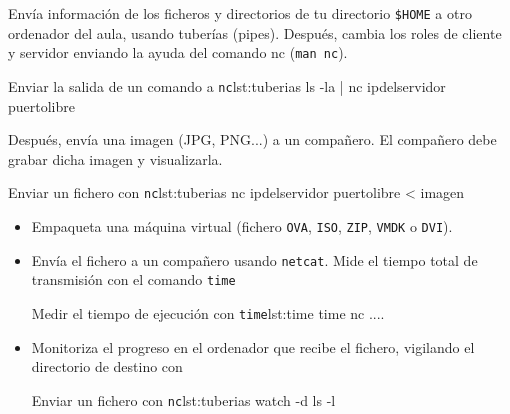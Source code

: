 \begin{homeworkProblem}
   Envía información de los ficheros y directorios de tu directorio \texttt{\$HOME} a otro ordenador del aula, usando tuberías (pipes). Después, cambia los roles de cliente y servidor enviando la ayuda del comando nc (\texttt{man nc}).



  \begin{listadoshell}{Enviar la salida de un comando a \texttt{nc}}{lst:tuberias}
    ls -la | nc ipdelservidor puertolibre
  \end{listadoshell}

  Después, envía una imagen (JPG, PNG...) a un compañero. El compañero debe grabar dicha imagen y visualizarla.

  \begin{listadoshell}{Enviar un fichero con \texttt{nc}}{lst:tuberias}
    nc ipdelservidor puertolibre < imagen
  \end{listadoshell}
\end{homeworkProblem}


\begin{homeworkProblem}
  \begin{itemize}
  \item Empaqueta una máquina virtual (fichero \texttt{OVA}, \texttt{ISO}, \texttt{ZIP}, \texttt{VMDK} o \texttt{DVI}).
  \item Envía el fichero a un compañero usando \texttt{netcat}. Mide el tiempo total de transmisión con el comando \texttt{time}

    \begin{listadoshell}{Medir el tiempo de ejecución con  \texttt{time}}{lst:time}
      time nc ....
    \end{listadoshell}
    
  \item Monitoriza el progreso en el ordenador que recibe el fichero, vigilando el directorio de destino con

    \begin{listadoshell}{Enviar un fichero con \texttt{nc}}{lst:tuberias}
      watch -d ls -l
    \end{listadoshell}

    
  \end{itemize}
\end{homeworkProblem}


